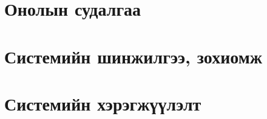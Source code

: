 \chapter{Онолын судалгаа}

\chapter{Системийн шинжилгээ, зохиомж}

\chapter{Системийн хэрэгжүүлэлт}

